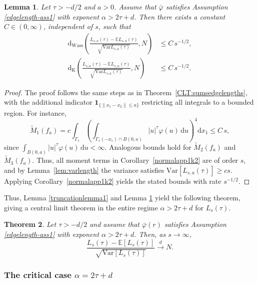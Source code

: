 \documentclass{article}
\newtheorem{theorem}{Theorem}[section]
\newtheorem{lemma}[theorem]{Lemma}
\theoremstyle{definition}
\numberwithin{equation}{section}
\theoremstyle{remark}
\newcommand{\E}{\mathbb{E}}
\newcommand{\Var}{\mathrm{Var}}
\begin{document}
\begin{lemma}\label{lem:CLT_truncated}
Let $\tau > -d/2$ and $a>0$. 
Assume that $\bar{\varphi}$ satisfies Assumption \ref{edgelength-ass1} with exponent $\alpha>2\tau+d$. Then there exists a constant $C\in(0,\infty)$, independent of $s$, such that
\begin{align*}
\mathrm{d}_{\mathrm{Wass}}\!\left(
\frac{L_{s,a}(\tau)-\E L_{s,a}(\tau)}{\sqrt{\Var L_{s,a}(\tau)}},
N
\right)
&\le C\,s^{-1/2},\\[0.4em]
\mathrm{d}_{\mathrm{K}}\!\left(
\frac{L_{s,a}(\tau)-\E L_{s,a}(\tau)}{\sqrt{\Var L_{s,a}(\tau)}},
N
\right)
&\le C\,s^{-1/2}.
\end{align*}
\end{lemma}

\begin{proof}
The proof follows the same steps as in Theorem~\ref{CLT:sumsedgelengths}, 
with the additional indicator $\mathbf{1}_{\{\|x_1-x_2\|\le a\}}$ restricting all integrals to a bounded region. 
For instance,
\[
\widetilde{M}_1(f_a)
= c \int_{\Gamma_s}
\!\left(
\int_{\Gamma_s(-x_1)\cap B(0,a)} |u|^{\tau}\varphi(u)\,\mathrm{d}u
\right)^{\!4}
\mathrm{d}x_1
\le C\,s,
\]
since $\int_{B(0,a)}|u|^{\tau}\varphi(u)\,\mathrm{d}u<\infty$.
Analogous bounds hold for $\widetilde{M}_2(f_a)$ and $\widetilde{M}_3(f_a)$.
Thus, all moment terms in Corollary~\ref{normalapp1k2} are of order $s$, 
and by Lemma~\ref{lem:varlength} the variance satisfies $\Var[L_{s,a}(\tau)]\geq cs$.
Applying Corollary~\ref{normalapp1k2} yields the stated bounds with rate $s^{-1/2}$.
\end{proof}

Thus, Lemma \ref{truncationlemma1} and Lemma \ref{lem:CLT_truncated} yield the following theorem, giving a central limit theorem in the entire regime $\alpha>2\tau+d$ for $L_{s}(\tau)$.

\begin{theorem}\label{thm:CLTedgelengths_full}
Let $\tau > -d/2$ and assume that $\bar{\varphi}(r)$ satisfies Assumption \ref{edgelength-ass1} with exponent $\alpha>2\tau+d$. 
Then, as $s\to\infty$,
\[
\frac{L_{s}(\tau)-\E[L_{s}(\tau)]}{\sqrt{\Var[L_{s}(\tau)]}}
\overset{d}{\longrightarrow} N.
\]
\end{theorem}


\subsubsection*{The critical case \texorpdfstring{$\alpha = 2\tau + d$}{α = 2τ + d}}
\label{subsubsec:criticalcase}
\end{document}
